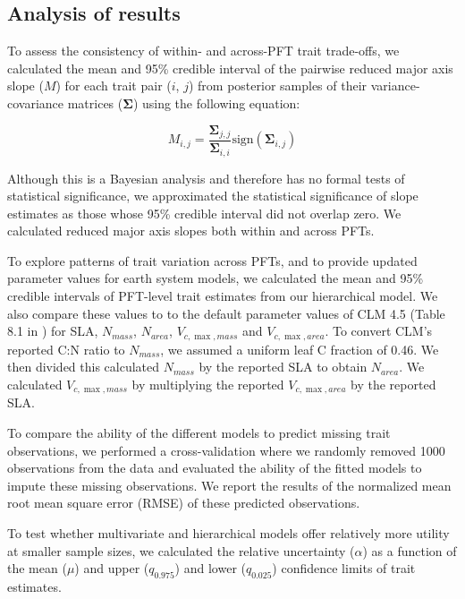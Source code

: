 \documentclass{article}
\begin{document}
\subsection{Analysis of results}

To assess the consistency of within- and across-PFT trait trade-offs,
we calculated the mean and 95\% credible interval of the pairwise reduced major axis slope ($M$) for each trait pair ($i$, $j$)
from posterior samples of their variance-covariance matrices ($\bm{\Sigma}$) using the following equation:

\begin{equation}
M_{i,j} = \frac{\bm{\Sigma}_{j,j}}{\bm{\Sigma}_{i,i}} \textrm{sign}(\bm{\Sigma}_{i,j})
\end{equation}

Although this is a Bayesian analysis and therefore has no formal tests of statistical significance,
we approximated the statistical significance of slope estimates as those whose 95\% credible interval did not overlap zero.
We calculated reduced major axis slopes both within and across PFTs.

To explore patterns of trait variation across PFTs,
and to provide updated parameter values for earth system models,
we calculated the mean and 95\% credible intervals of PFT-level trait estimates from our hierarchical model.
We also compare these values to to the default parameter values of CLM 4.5 (Table 8.1 in \citealt{clm45_note}) for SLA, $N_{mass}$, $N_{area}$, $V_{c,\max,mass}$ and $V_{c,\max,area}$.
To convert CLM's reported C:N ratio to $N_{mass}$, we assumed a uniform leaf C fraction of 0.46.
We then divided this calculated $N_{mass}$ by the reported SLA to obtain $N_{area}$.
We calculated $V_{c,\max,mass}$ by multiplying the reported $V_{c,\max,area}$ by the reported SLA.

To compare the ability of the different models to predict missing trait observations,
we performed a cross-validation where we randomly removed 1000 observations from the data
and evaluated the ability of the fitted models to impute these missing observations.
We report the results of the normalized mean root mean square error (RMSE) of these predicted observations.

To test whether multivariate and hierarchical models offer relatively more utility at smaller sample sizes,
we calculated the relative uncertainty ($\alpha$) as a function of the mean ($\mu$) and upper ($q_{0.975}$) and lower ($q_{0.025}$) confidence limits of trait estimates.
\end{document}
